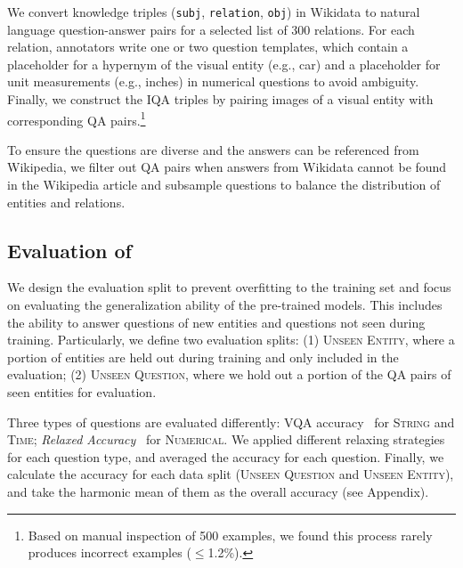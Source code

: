 \documentclass[11pt]{article}
\begin{document}
We convert knowledge triples ({\small \texttt{subj}, \texttt{relation}, \texttt{obj}}{}) in Wikidata to natural language question-answer pairs for a selected list of 300 relations. For each relation, annotators write one or two question templates, which contain a placeholder for a hypernym of the visual entity (e.g., car) and a placeholder for unit measurements (e.g., inches) in numerical questions to avoid ambiguity. 
Finally, we construct the IQA triples by pairing images of a visual entity with corresponding QA pairs.\footnote{Based on manual inspection of 500 examples, we found this process rarely produces incorrect examples ($\le$1.2\%).}

To ensure the questions are diverse and the answers can be referenced from Wikipedia, we filter out QA pairs when answers from Wikidata cannot be found in the Wikipedia article and subsample questions to balance the distribution of entities and relations.


\subsection{Evaluation of \textbf{\ourdataset}}
\label{sec:split}

We design the evaluation split to prevent overfitting to the training set and focus on evaluating the generalization ability of the pre-trained models. This includes the ability to answer questions of new entities and questions not seen during training.
Particularly, we define two evaluation splits: (1) \textsc{Unseen Entity}, where a portion of entities are held out during training and only included in the evaluation; (2) \textsc{Unseen Question}, where we hold out a portion of the QA pairs of seen entities for evaluation. 

\label{sec:metric}
Three types of questions are evaluated differently: VQA accuracy~\cite{balanced_vqa_v2} for \textsc{String} and \textsc{Time}; {\em Relaxed Accuracy}~\cite{methani2020plotqa} for \textsc{Numerical}.
We applied different relaxing strategies for each question type, and averaged the accuracy for each question.
Finally, we calculate the accuracy for each data split (\textsc{Unseen Question} and \textsc{Unseen Entity}), and take the harmonic mean of them as the overall accuracy (see Appendix).
 
\end{document}
